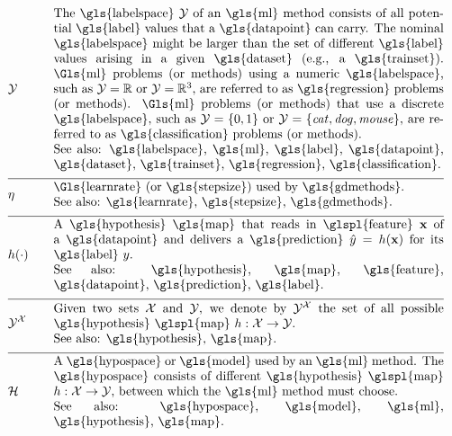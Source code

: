 \begin{align}
	&\labelspace  &\quad & \parbox{.90\textwidth}{The \gls{labelspace} $\labelspace$ of 
		an \gls{ml} method consists of all potential \gls{label} values that a \gls{datapoint} can 
		carry. The nominal \gls{labelspace} might be larger than the set of different \gls{label} 
		values arising in a given \gls{dataset} (e.g., a \gls{trainset}). \Gls{ml} problems 
		(or methods) using a numeric \gls{labelspace}, such as $\labelspace=\mathbb{R}$ 
		or $\labelspace=\mathbb{R}^{3}$, are referred to as \gls{regression} problems (or methods). \Gls{ml} 
		problems (or methods) that use a discrete \gls{labelspace}, such as $\labelspace=\{0,1\}$ or $\labelspace=\{\mbox{\emph{cat}},\mbox{\emph{dog}},\mbox{\emph{mouse}}\}$, 
		are referred to as \gls{classification} problems (or methods).
		\\ See also: \gls{labelspace}, \gls{ml}, \gls{label}, \gls{datapoint},  \gls{dataset}, \gls{trainset}, 
		\gls{regression}, \gls{classification}.}  \nonumber \\[2mm] \hline \nonumber\\[-5mm]
	&\lrate  &\quad & \parbox{.90\textwidth}{\Gls{learnrate} (or \gls{stepsize}) used by \gls{gdmethods}.
		\\ See also: \gls{learnrate}, \gls{stepsize}, \gls{gdmethods}. }  \nonumber \\[2mm] \hline \nonumber\\[-5mm]
	&\hypothesis(\cdot)  &\quad &\parbox{.90\textwidth}{A \gls{hypothesis} \gls{map} that reads in \glspl{feature} $\featurevec$ of a \gls{datapoint} 
		and delivers a \gls{prediction} $\hat{\truelabel}=\hypothesis(\featurevec)$ for its \gls{label} $\truelabel$.
		\\ See also: \gls{hypothesis}, \gls{map}, \gls{feature}, \gls{datapoint}, \gls{prediction}, \gls{label}. }  	 \nonumber \\[2mm] \hline \nonumber\\[-5mm]
	 &\labelspace^{\featurespace} &\quad & \parbox{.90\textwidth}{Given two sets $\featurespace$ and $\labelspace$, we denote by $ \labelspace^{\featurespace}$ 
	 	the set of all possible \gls{hypothesis} \glspl{map} $\hypothesis: \featurespace \rightarrow \labelspace$.
		\\ See also: \gls{hypothesis}, \gls{map}. } 	 \nonumber \\[2mm] \hline \nonumber\\[-5mm]
	&\hypospace  &\quad & \parbox{.90\textwidth}{A \gls{hypospace} or \gls{model} used by an \gls{ml} method. 
		The \gls{hypospace} consists of different \gls{hypothesis} \glspl{map} $\hypothesis: \featurespace \rightarrow \labelspace$, between which 
		the \gls{ml} method must choose.
		\\ See also: \gls{hypospace}, \gls{model}, \gls{ml}, \gls{hypothesis}, \gls{map}. }   \nonumber 
\end{align}     

